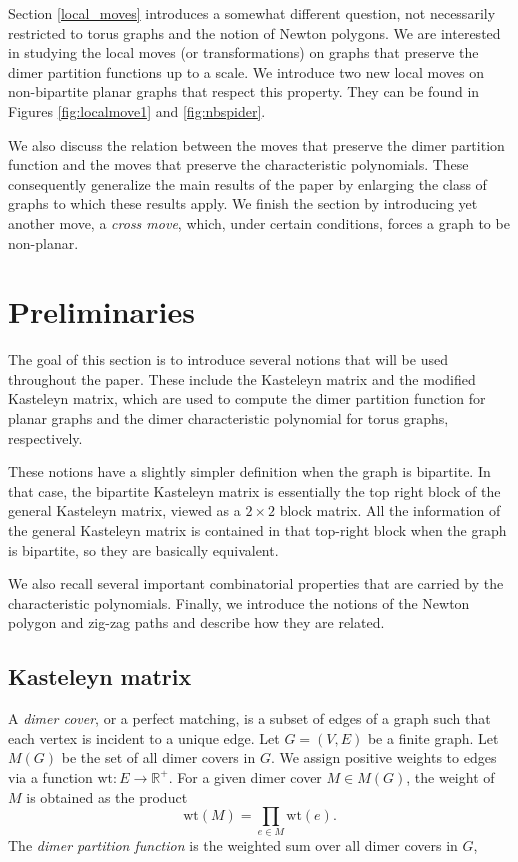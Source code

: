 \documentclass[12pt,a4paper]{article}
\theoremstyle{definition}
\def\wt{\mathrm {wt}}
\begin{document}
Section \ref{local_moves} introduces a somewhat different question, not necessarily restricted to torus graphs and the notion of Newton polygons. We are interested in studying the local moves (or transformations) on graphs that preserve the dimer partition functions up to a scale. We introduce two new local moves on non-bipartite planar graphs that respect this property. They can be found in Figures \ref{fig:localmove1} and \ref{fig:nbspider}. 

We also discuss the relation between the moves that preserve the dimer partition function and the moves that preserve the characteristic polynomials. These consequently generalize the main results of the paper by enlarging the class of graphs to which these results apply. We finish the section by introducing yet another move, a \emph{cross move}, which, under certain conditions, forces a graph to be non-planar.

\section{Preliminaries}

The goal of this section is to introduce several notions that will be used throughout the paper. These include the Kasteleyn matrix and the modified Kasteleyn matrix, which are used to compute the dimer partition function for planar graphs and the dimer characteristic polynomial for torus graphs, respectively. 

These notions have a slightly simpler definition when the graph is bipartite. In that case, the bipartite Kasteleyn matrix is essentially the top right block of the general Kasteleyn matrix, viewed as a $2 \times 2$ block matrix. All the information of the general Kasteleyn matrix is contained in that top-right block when the graph is bipartite, so they are basically equivalent.

We also recall several important combinatorial properties that are carried by the characteristic polynomials. Finally, we introduce the notions of the Newton polygon and zig-zag paths and describe how they are related.

\subsection{Kasteleyn matrix} \label{Kast_matrix}

A \emph{dimer cover}, or a perfect matching, is a subset of edges of a graph such that each vertex is incident to a unique edge. Let $G = (V,E)$ be a finite graph. Let $M(G)$ be the set of all dimer covers in $G$. We assign positive weights to edges via a function $\wt: E \rightarrow \mathbb{R}^{+}$. For a given dimer cover $M \in M(G)$, the weight of $M$ is obtained as the product \[\wt(M) = \prod_{e \in M} \wt(e).\] 
The \emph{dimer partition function} is the weighted sum over all dimer covers in $G$,
\end{document}

